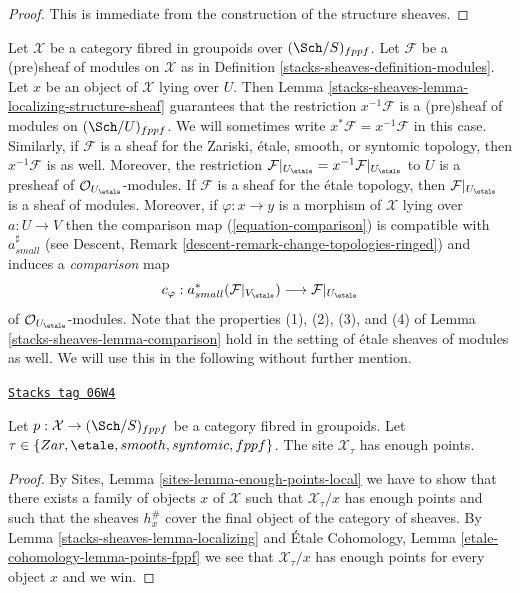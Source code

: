 \begin{proof}
This is immediate from the construction of the structure sheaves.
\end{proof}

Let $\mathcal{X}$ be a category fibred in groupoids over $(\Sch/S)_{fppf}$.
Let $\mathcal{F}$ be a (pre)sheaf of modules on $\mathcal{X}$ as in
Definition \ref{stacks-sheaves-definition-modules}.
Let $x$ be an object of $\mathcal{X}$ lying over $U$. Then
Lemma \ref{stacks-sheaves-lemma-localizing-structure-sheaf}
guarantees that the restriction
$x^{-1}\mathcal{F}$ is a (pre)sheaf of modules on $(\Sch/U)_{fppf}$.
We will sometimes write $x^*\mathcal{F} = x^{-1}\mathcal{F}$ in this case.
Similarly, if $\mathcal{F}$ is a sheaf for the Zariski, \'etale, smooth,
or syntomic topology, then $x^{-1}\mathcal{F}$ is as well. Moreover, the
restriction
$\mathcal{F}|_{U_\etale} = x^{-1}\mathcal{F}|_{U_\etale}$
to $U$ is a presheaf of $\mathcal{O}_{U_\etale}$-modules.
If $\mathcal{F}$ is a sheaf for the \'etale topology, then
$\mathcal{F}|_{U_\etale}$ is a sheaf of modules. Moreover,
if $\varphi : x \to y$ is a morphism of $\mathcal{X}$ lying over
$a : U \to V$ then the comparison map (\ref{equation-comparison})
is compatible with $a_{small}^\sharp$ (see
Descent, Remark \ref{descent-remark-change-topologies-ringed})
and induces a {\it comparison} map
\begin{equation}
\label{equation-comparison-modules}
c_\varphi : a_{small}^*(\mathcal{F}|_{V_\etale})
\longrightarrow
\mathcal{F}|_{U_\etale}
\end{equation}
of $\mathcal{O}_{U_\etale}$-modules.
Note that the properties (1), (2), (3), and (4) of
Lemma \ref{stacks-sheaves-lemma-comparison}
hold in the setting of \'etale sheaves of modules as well.
We will use this in the following without further mention.

\begin{lemma}
\label{stacks-sheaves-lemma-enough-points}
\href{https://stacks.math.columbia.edu/tag/06W4}{\texttt{Stacks tag 06W4}}

Let $p : \mathcal{X} \to (\Sch/S)_{fppf}$ be a category fibred
in groupoids. Let $\tau \in \{Zar, \etale, smooth, syntomic, fppf\}$.
The site $\mathcal{X}_\tau$ has enough points.
\end{lemma}

\begin{proof}
By
Sites, Lemma \ref{sites-lemma-enough-points-local}
we have to show that there exists a family of objects $x$ of $\mathcal{X}$
such that $\mathcal{X}_\tau/x$ has enough points and such that the sheaves
$h_x^\#$ cover the final object of the category of sheaves.
By
Lemma \ref{stacks-sheaves-lemma-localizing}
and
\'Etale Cohomology, Lemma \ref{etale-cohomology-lemma-points-fppf}
we see that $\mathcal{X}_\tau/x$ has enough points for every object
$x$ and we win.
\end{proof}

